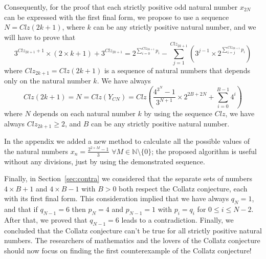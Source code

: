 \documentclass[11pt,a4paper]{article}
\newcommand{\N}{\mathbb{N}}
\theoremstyle{definition}
\begin{document}
Consequently, for the proof that each strictly positive odd natural number $x_{2N}$ can be
expressed with the first final form, we propose to use a sequence $N=Clz(2k+1)$, where $k$
can be any strictly positive natural number, and we will have to prove that
\[3^{Clz_{2k+1}+1}\times(2\times k+1)+3^{Clz_{2k+1}}=2^{\sum_{i=0}^{Clz_{2k+1}}p_i}-\sum_{j=1}^{Clz_{2k+1}}\left(3^{j-1}\times 2^{\sum_{i=j}^{Clz_{2k+1}}p_i}\right)\]
where $Clz_{2k+1}=Clz(2k+1)$ is a sequence of natural numbers that depends only on the
natural number $k$. We have always
\[Clz(2k+1)=N=Clz(Y_{CN})=Clz\left(\frac{4^{3^{N}}-1}{3^{N+1}}\times 2^{2B+2N}+\sum_{i=0}^{B-1}4^{i}\right)\]
where $N$ depends on each natural number $k$ by using the sequence $Clz$, we have always
$Clz_{2k+1}\ge 2$, and $B$ can be any strictly positive natural number.

In the appendix we added a new method to calculate all the possible values of the natural
numbers $x_n=\frac{2^{2\times M}-1}{3}$ $\forall M\in\N\setminus\{0\}$; the proposed
algorithm is useful without any divisions, just by using the demonstrated sequence.

Finally, in Section~\ref{sec:contra} we considered that the separate sets of numbers
$4\times B+1$ and $4\times B-1$ with $B>0$ both respect the Collatz conjecture, each with
its first final form. This consideration implied that we have always $q_N=1$, and that if
$q_{N-1}=6$ then $p_N=4$ and $p_{N-1}=1$ with $p_i=q_i$ for $0\le i\le N-2$. After that, we proved
that $q_{N-1}=6$ leads to a contradiction. Finally, we concluded that the Collatz
conjecture can't be true for all strictly positive natural numbers. The researchers of
mathematics and the lovers of the Collatz conjecture should now focus on finding the first
counterexample of the Collatz conjecture!

\appendix
\end{document}
